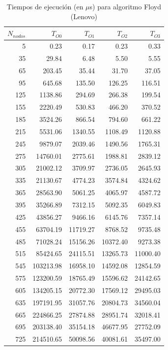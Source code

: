 \documentclass{homework}
\begin{document}
    \begin{table}[H]
        \centering
        \begin{tabular}{|r|r|r|r|r|}
            \hline
            $N_{nodos}$ & $T_{O0}$ & $T_{O1}$ & $T_{O2}$ & $T_{O3}$ \\
            \hline
            5 & 0.23 & 0.17 & 0.23 & 0.33 \\ 
            35 & 29.84 & 6.48 & 5.50 & 5.55 \\ 
            65 & 203.45 & 35.44 & 31.70 & 37.05 \\ 
            95 & 645.68 & 135.50 & 126.25 & 116.51 \\ 
            125 & 1138.86 & 294.69 & 266.38 & 199.54 \\ 
            155 & 2220.49 & 530.83 & 466.20 & 370.52 \\ 
            185 & 3524.26 & 866.54 & 794.60 & 661.22 \\ 
            215 & 5531.06 & 1340.55 & 1108.49 & 1120.88 \\ 
            245 & 9879.07 & 2039.46 & 1490.56 & 1765.31 \\ 
            275 & 14760.01 & 2775.61 & 1988.81 & 2839.12 \\ 
            305 & 21002.12 & 3709.97 & 2736.05 & 2645.93 \\ 
            335 & 21130.67 & 4774.23 & 3574.84 & 4324.62 \\ 
            365 & 28563.90 & 5061.25 & 4065.97 & 4587.72 \\ 
            395 & 35266.89 & 7312.15 & 5092.35 & 6049.83 \\ 
            425 & 43856.27 & 9466.16 & 6145.76 & 7357.14 \\ 
            455 & 63704.19 & 11719.27 & 8768.52 & 9735.48 \\ 
            485 & 71028.24 & 15156.26 & 10372.40 & 9273.38 \\ 
            515 & 85424.65 & 24115.51 & 13265.73 & 11000.40 \\ 
            545 & 103213.98 & 16958.10 & 14592.08 & 12854.59 \\ 
            575 & 123200.59 & 18765.49 & 15596.62 & 24142.65 \\ 
            605 & 134205.15 & 20772.30 & 17569.12 & 29495.03 \\ 
            635 & 197191.95 & 31057.76 & 20804.73 & 34560.04 \\ 
            665 & 224866.25 & 27874.88 & 28951.74 & 32018.41 \\ 
            695 & 203138.40 & 35154.18 & 46677.95 & 27752.09 \\ 
            725 & 214510.65 & 50098.56 & 40081.61 & 35497.00 \\ 
            \hline
        \end{tabular}
        \caption{Tiempos de ejecución (en $\mu$s) para algoritmo Floyd (Lenovo)}
    \end{table}
\end{document}

